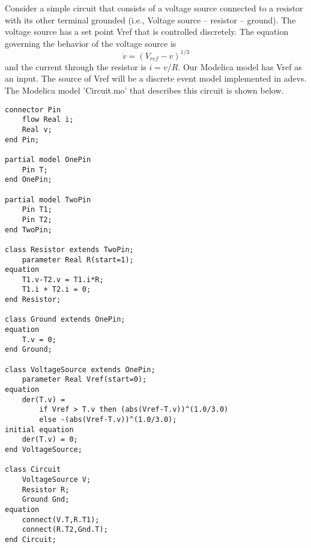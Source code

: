 Consider a simple circuit that consists of a voltage source connected to a resistor with its other terminal grounded (i.e., Voltage source -- resistor -- ground). The voltage source has a set point Vref that is controlled discretely. The equation governing the behavior of the voltage source is
\begin{equation*}
\dot{v} = (V_{ref} - v)^{1/3}
\end{equation*}
and the current through the resistor is $i = v/R$. Our Modelica model has Vref as an input. The source of Vref will be a discrete event model implemented in adevs. The Modelica model 'Circuit.mo' that describes this circuit is shown below.
\begin{verbatim}
connector Pin
    flow Real i;
    Real v;
end Pin;

partial model OnePin
    Pin T;
end OnePin;

partial model TwoPin
    Pin T1;
    Pin T2;
end TwoPin;

class Resistor extends TwoPin;
    parameter Real R(start=1);
equation
    T1.v-T2.v = T1.i*R;
    T1.i + T2.i = 0;
end Resistor;

class Ground extends OnePin;
equation
    T.v = 0;
end Ground;

class VoltageSource extends OnePin;
    parameter Real Vref(start=0);
equation
    der(T.v) = 
        if Vref > T.v then (abs(Vref-T.v))^(1.0/3.0)
        else -(abs(Vref-T.v))^(1.0/3.0);
initial equation
    der(T.v) = 0;
end VoltageSource;

class Circuit
    VoltageSource V;
    Resistor R;
    Ground Gnd;
equation
    connect(V.T,R.T1);
    connect(R.T2,Gnd.T);
end Circuit;
\end{verbatim}

